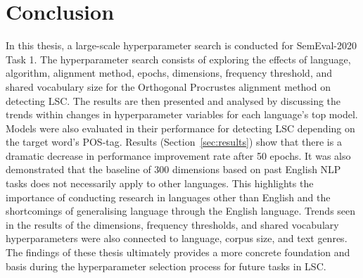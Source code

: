\section{Conclusion}

In this thesis, a large-scale hyperparameter search is conducted for SemEval-2020 Task 1. The hyperparameter search consists of exploring the effects of language, algorithm, alignment method, epochs, dimensions, frequency threshold, and shared vocabulary size for the Orthogonal Procrustes alignment method on detecting LSC. The results are then presented and analysed by discussing the trends within changes in hyperparameter variables for each language's top model. Models were also evaluated in their performance for detecting LSC depending on the target word's POS-tag. Results (Section~\ref{sec:results}) show that there is a dramatic decrease in performance improvement rate after 50 epochs. It was also demonstrated that the baseline of 300 dimensions based on past English NLP tasks does not necessarily apply to other languages. This highlights the importance of conducting research in languages other than English and the shortcomings of generalising language through the English language. Trends seen in the results of the dimensions, frequency thresholds, and shared vocabulary hyperparameters were also connected to language, corpus size, and text genres. The findings of these thesis ultimately provides a more concrete foundation and basis during the hyperparameter selection process for future tasks in LSC. 